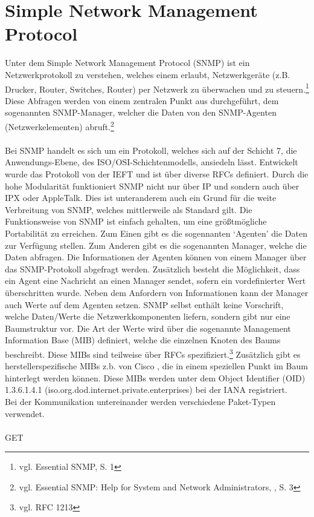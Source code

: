 \section{Simple Network Management Protocol}
\label{sec:snmp}
Unter dem Simple Network Management Protocol (SNMP) ist ein Netzwerkprotokoll zu verstehen, welches einem erlaubt, Netzwerkgeräte (z.B. Drucker, Router, Switches, Router) per Netzwerk zu überwachen und zu steuern.\footnote{vgl. Essential SNMP, S. 1}
Diese Abfragen werden von einem zentralen Punkt aus durchgeführt, dem sogenannten SNMP-Manager, welcher die Daten von den SNMP-Agenten (Netzwerkelementen) abruft.\footnote{vgl. Essential SNMP: Help for System and Network Administrators, , S. 3}\\\\
Bei SNMP handelt es sich um ein Protokoll, welches sich auf der Schicht 7, die Anwendungs-Ebene, des ISO/OSI-Schichtenmodells, ansiedeln lässt.
Entwickelt wurde das Protokoll von der IEFT und ist über diverse RFCs definiert.
Durch die hohe Modularität funktioniert SNMP nicht nur über IP und sondern auch über IPX oder AppleTalk.
Dies ist unteranderem auch ein Grund für die weite Verbreitung von SNMP, welches mittlerweile als Standard gilt.
Die Funktionsweise von SNMP ist einfach gehalten, um eine größtmögliche Portabilität zu erreichen.
Zum Einen gibt es die sogennanten ‘Agenten’ die Daten zur Verfügung stellen. Zum Anderen gibt es die sogenannten Manager, welche die Daten abfragen.
Die Informationen der Agenten können von einem Manager über das SNMP-Protokoll abgefragt werden.
Zusätzlich besteht die Möglichkeit, dass ein Agent eine Nachricht an einen Manager sendet, sofern ein vordefinierter Wert überschritten wurde.
Neben dem Anfordern von Informationen kann der Manager auch Werte auf dem Agenten setzen.
SNMP selbst enthält keine Vorschrift, welche Daten/Werte die Netzwerkkomponenten liefern, sondern gibt nur eine Baumstruktur vor.
Die Art der Werte wird über die sogenannte Management Information Base (MIB) definiert, welche die einzelnen Knoten des Baums beschreibt.
Diese MIBs sind teilweise über RFCs spezifiziert.\footnote{vgl. RFC 1213}
Zusätzlich gibt es herstellerspezifische MIBs z.b. von Cisco , die in einem speziellen Punkt im Baum hinterlegt werden können. Diese MIBs werden unter dem  Object Identifier (OID) 1.3.6.1.4.1 (iso.org.dod.internet.private.enterprises) bei der IANA registriert.\\
Bei der Kommunikation untereinander werden verschiedene Paket-Typen verwendet.\\
\\
GET\\

